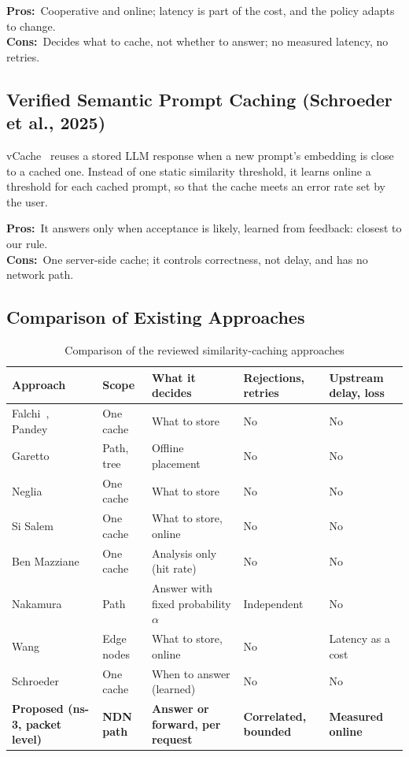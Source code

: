 \documentclass[11pt,a4paper]{article}
\renewcommand{\arraystretch}{1.45}
\newcommand{\pros}{\textcolor{green!50!black}{\textbf{Pros:}}~}
\newcommand{\cons}{\textcolor{red!70!black}{\textbf{Cons:}}~}
\begin{document}
\pros Cooperative and online; latency is part of the cost, and the policy adapts to change.\\
\cons Decides what to cache, not whether to answer; no measured latency, no retries.

\subsection{Verified Semantic Prompt Caching (Schroeder et al., 2025)}
vCache~\cite{schroeder2025vcache} reuses a stored LLM response when a new prompt's embedding is
close to a cached one. Instead of one static similarity threshold, it learns online a threshold for
each cached prompt, so that the cache meets an error rate set by the user.

\pros It answers only when acceptance is likely, learned from feedback: closest to our rule.\\
\cons One server-side cache; it controls correctness, not delay, and has no network path.

\subsection{Comparison of Existing Approaches}\label{sec:lit-compare}

\begin{table}[H]
\centering
\caption{Comparison of the reviewed similarity-caching approaches}
\label{tab:compare}
\footnotesize
\renewcommand{\arraystretch}{1.1}
\begin{tabularx}{\linewidth}{@{}>{\raggedright}p{3.4cm}>{\raggedright}p{1.8cm}>{\raggedright}X>{\raggedright}p{2.6cm}>{\raggedright\arraybackslash}p{2.5cm}@{}}
\toprule
\textbf{Approach} & \textbf{Scope} & \textbf{What it decides} & \textbf{Rejections, retries} &
\textbf{Upstream delay, loss} \\
\midrule
Falchi~\cite{falchi2008metric}, Pandey~\cite{pandey2009nn} & One cache & What to store & No & No \\
Garetto~\cite{garetto2021placement} & Path, tree & Offline placement & No & No \\
Neglia~\cite{neglia2022similarity} & One cache & What to store & No & No \\
Si Salem~\cite{sisalem2023acai} & One cache & What to store, online & No & No \\
Ben Mazziane~\cite{benmazziane2024ttl} & One cache & Analysis only (hit rate) & No & No \\
Nakamura~\cite{nakamura2024analysis} & Path & Answer with fixed probability $\alpha$ & Independent & No \\
Wang~\cite{wang2025bandit} & Edge nodes & What to store, online & No & Latency as a cost \\
Schroeder~\cite{schroeder2025vcache} & One cache & When to answer (learned) & No & No \\
\midrule
\textbf{Proposed (ns-3, packet level)} & \textbf{NDN path} & \textbf{Answer or forward, per request} &
\textbf{Correlated, bounded} & \textbf{Measured online} \\
\bottomrule
\end{tabularx}
\end{table}
\end{document}
